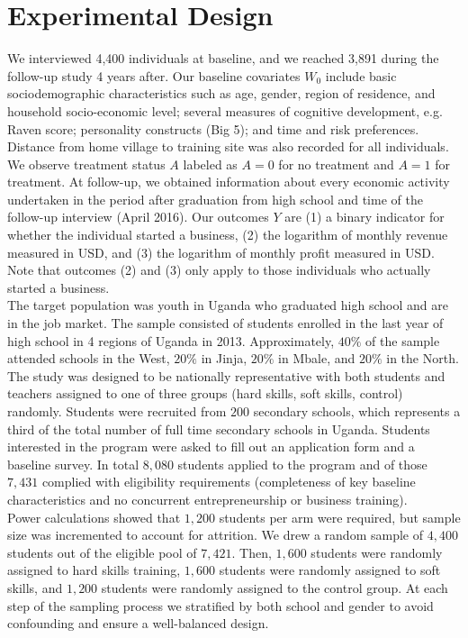 \documentclass[oneside, notitlepage]{book}
\begin{document}
\section{Experimental Design}
\label{cha:data-exper-descr}

We interviewed 4,400 individuals at baseline, and we reached 3,891 during the follow-up study 4 years after. Our baseline covariates $W_0$ include basic sociodemographic characteristics such as age, gender, region of residence, and household socio-economic level; several measures of cognitive development, e.g. Raven score; personality constructs (Big 5); and time and risk preferences. Distance from home village to training site was also recorded for all individuals. We observe treatment status $A$ labeled as $A=0$ for no treatment and $A = 1$ for treatment. At follow-up, we obtained information about every economic activity undertaken in the period after graduation from high school and time of the follow-up interview (April 2016). Our outcomes $Y$ are (1) a binary indicator for whether the individual started a business, (2) the logarithm of monthly revenue measured in USD, and (3) the logarithm of monthly profit measured in USD. Note that outcomes (2) and (3) only apply to those individuals who actually started a business.\\

The target population was youth in Uganda who graduated high school and are in the job market. The sample consisted of students enrolled in the last year of high school in 4 regions of Uganda in 2013. Approximately, $40\%$ of the sample attended schools in the West, $20\%$ in Jinja, $20\%$ in Mbale, and $20\%$ in the North. The study was designed to be nationally representative with both students and teachers assigned to one of three groups (hard skills, soft skills, control) randomly. Students were recruited from $200$ secondary schools, which represents a third of the total number of full time secondary schools in Uganda. Students interested in the program were asked to fill out an application form and a baseline survey. In total $8,080$ students applied to the program and of those $7,431$ complied with eligibility requirements (completeness of key baseline characteristics and no concurrent entrepreneurship or business training). \\

Power calculations showed that $1,200$ students per arm were required, but sample size was incremented to account for attrition. We drew a random sample of $4,400$ students out of the eligible pool of $7,421$. Then, $1,600$ students were randomly assigned to hard skills training, $1,600$ students were randomly assigned to soft skills, and $1,200$ students were randomly assigned to the control group. At each step of the sampling process we stratified by both school and gender to avoid confounding and ensure a well-balanced design.\\
\end{document}
